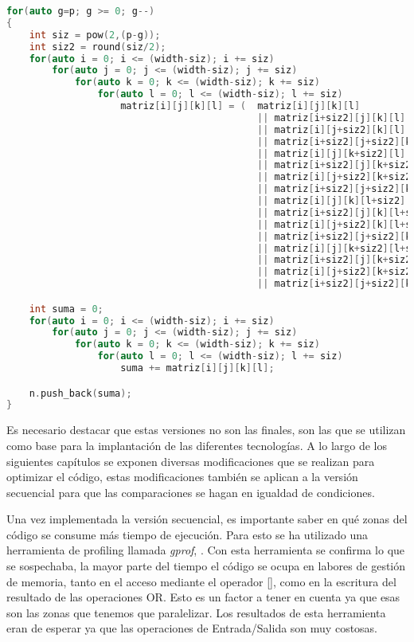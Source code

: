 \newpage
\begin{lstlisting}[language=C++,caption={Primera versión del Boxcount4D programado en C++},label=CppBox4D,basicstyle=\tiny]
for(auto g=p; g >= 0; g--)
{
    int siz = pow(2,(p-g));
    int siz2 = round(siz/2);
    for(auto i = 0; i <= (width-siz); i += siz)
        for(auto j = 0; j <= (width-siz); j += siz)
            for(auto k = 0; k <= (width-siz); k += siz)
                for(auto l = 0; l <= (width-siz); l += siz)
                    matriz[i][j][k][l] = (  matriz[i][j][k][l] 
                                            || matriz[i+siz2][j][k][l] 
                                            || matriz[i][j+siz2][k][l] 
                                            || matriz[i+siz2][j+siz2][k][l] 
                                            || matriz[i][j][k+siz2][l] 
                                            || matriz[i+siz2][j][k+siz2][l] 
                                            || matriz[i][j+siz2][k+siz2][l] 
                                            || matriz[i+siz2][j+siz2][k+siz2][l] 
                                            || matriz[i][j][k][l+siz2] 
                                            || matriz[i+siz2][j][k][l+siz2] 
                                            || matriz[i][j+siz2][k][l+siz2] 
                                            || matriz[i+siz2][j+siz2][k][l+siz2] 
                                            || matriz[i][j][k+siz2][l+siz2] 
                                            || matriz[i+siz2][j][k+siz2][l+siz2] 
                                            || matriz[i][j+siz2][k+siz2][l+siz2] 
                                            || matriz[i+siz2][j+siz2][k+siz2][l+siz2] );

    int suma = 0; 
    for(auto i = 0; i <= (width-siz); i += siz)
        for(auto j = 0; j <= (width-siz); j += siz)
            for(auto k = 0; k <= (width-siz); k += siz)
                for(auto l = 0; l <= (width-siz); l += siz)
                    suma += matriz[i][j][k][l];

    n.push_back(suma);
}
\end{lstlisting}

Es necesario destacar que estas versiones no son las finales, son las que se utilizan como base para la implantación de las diferentes tecnologías. A lo largo de los siguientes capítulos se exponen diversas modificaciones que se realizan para optimizar el código, estas modificaciones también se aplican a la versión secuencial para que las comparaciones se hagan en igualdad de condiciones.

Una vez implementada la versión secuencial, es importante saber en qué zonas del código se consume más tiempo de ejecución. Para esto se ha utilizado una herramienta de profiling llamada \textit{gprof}, \cite{unknown-author-no-dateI}. Con esta herramienta se confirma lo que se sospechaba, la mayor parte del tiempo el código se ocupa en labores de gestión de memoria, tanto en el acceso mediante el operador [], como en la escritura del resultado de las operaciones OR. Esto es un factor a tener en cuenta ya que esas son las zonas que tenemos que paralelizar. Los resultados de esta herramienta eran de esperar ya que las operaciones de Entrada/Salida son muy costosas.